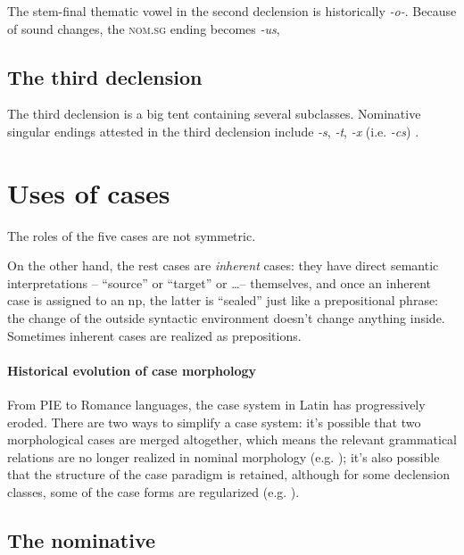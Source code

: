 \documentclass[a4paper, oneside, 12pt]{report}
\newcommand*{\citesec}[1]{\S~{#1}}
\newcommand{\form}[1]{\emph{#1}}
\newcommand*{\category}[1]{\textsc{#1}}
\begin{document}
The stem-final thematic vowel in the second declension is historically \form{-o-}.
Because of sound changes, the \category{nom.sg} ending becomes \form{-us},

\subsection{The third declension}\label{sec:np.inflection.3}

The third declension is a big tent containing several subclasses.
Nominative singular endings attested in the third declension
include \form{-s}, \form{-t}, \form{-x} (i.e. \form{-cs}) \citep[\citesec{53}]{allen1903allen}.

\section{Uses of cases}\label{sec:np.case-distribution}

The roles of the five cases are not symmetric.


On the other hand, the rest cases are \emph{inherent} cases:
they have direct semantic interpretations
-- ``source'' or ``target'' or \dots -- themselves,
and once an inherent case is assigned to an \acs{np},
the latter is ``sealed'' just like a prepositional phrase:
the change of the outside syntactic environment 
doesn't change anything inside.
Sometimes inherent cases are realized as prepositions.

\paragraph*{Historical evolution of case morphology}
From PIE to Romance languages, the case system in Latin has progressively eroded.
There are two ways to simplify a case system:
it's possible that two morphological cases are merged altogether,
which means the relevant grammatical relations are no longer realized in nominal morphology
(e.g. );
it's also possible that the structure of the case paradigm is retained,
although for some declension classes,
some of the case forms are regularized
(e.g. ).


\subsection{The nominative}
\end{document}
